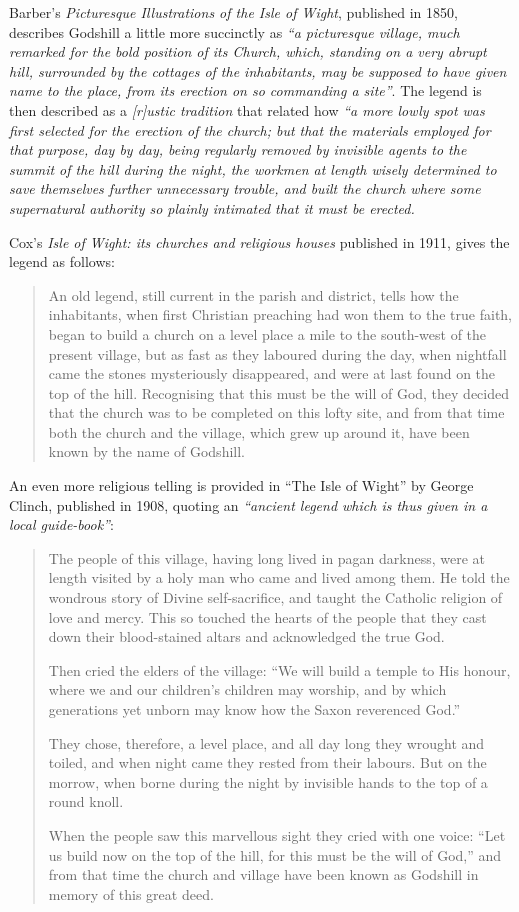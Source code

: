 \documentclass[
  12pt,
  a5paper,
  twoside]{book}
\begin{document}
Barber's \emph{Picturesque Illustrations of the Isle of Wight},
published in 1850, describes Godshill a little more succinctly as
\emph{``a picturesque village, much remarked for the bold position of
its Church, which, standing on a very abrupt hill, surrounded by the
cottages of the inhabitants, may be supposed to have given name to the
place, from its erection on so commanding a site''}. The legend is then
described as a \emph{{[}r{]}ustic tradition} that related how \emph{``a
more lowly spot was first selected for the erection of the church; but
that the materials employed for that purpose, day by day, being
regularly removed by invisible agents to the summit of the hill during
the night, the workmen at length wisely determined to save themselves
further unnecessary trouble, and built the church where some
supernatural authority so plainly intimated that it must be erected.}

Cox's \emph{Isle of Wight: its churches and religious houses} published
in 1911, gives the legend as follows:

\begin{quote}
An old legend, still current in the parish and district, tells how the
inhabitants, when first Christian preaching had won them to the true
faith, began to build a church on a level place a mile to the south-west
of the present village, but as fast as they laboured during the day,
when nightfall came the stones mysteriously disappeared, and were at
last found on the top of the hill. Recognising that this must be the
will of God, they decided that the church was to be completed on this
lofty site, and from that time both the church and the village, which
grew up around it, have been known by the name of Godshill.
\end{quote}

An even more religious telling is provided in ``The Isle of Wight'' by
George Clinch, published in 1908, quoting an \emph{``ancient legend
which is thus given in a local guide-book''}:

\begin{quote}
The people of this village, having long lived in pagan darkness, were at
length visited by a holy man who came and lived among them. He told the
wondrous story of Divine self-sacrifice, and taught the Catholic
religion of love and mercy. This so touched the hearts of the people
that they cast down their blood-stained altars and acknowledged the true
God.

Then cried the elders of the village: ``We will build a temple to His
honour, where we and our children's children may worship, and by which
generations yet unborn may know how the Saxon reverenced God.''

They chose, therefore, a level place, and all day long they wrought and
toiled, and when night came they rested from their labours. But on the
morrow, when borne during the night by invisible hands to the top of a
round knoll.

When the people saw this marvellous sight they cried with one voice:
``Let us build now on the top of the hill, for this must be the will of
God,'' and from that time the church and village have been known as
Godshill in memory of this great deed.
\end{quote}
\end{document}
